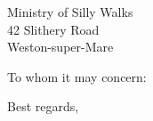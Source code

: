 \documentclass{scrlttr2}
\begin{document}
\begin{letter}{Ministry of Silly Walks\\42 Slithery Road\\Weston-super-Mare}
  \opening{To whom it may concern:}
  \thispagestyle{TUM.letterpage}

  \Blindtext

  \closing{Best regards,}
\end{letter}
\end{document}
